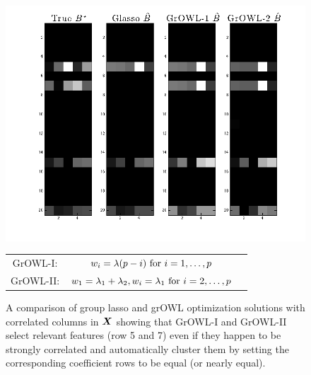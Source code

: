 \begin{figure}[!t]
    \centering
    \includegraphics[width=0.9\linewidth]{figures/sim3.png}
    \qquad
    \begin{tabular}[b]{ccc}
    \hline
    	GrOWL-I:	& $w_i = \lambda (p - i) \textnormal{ for } i = 1, \dots,  p $   &\\ 
	GrOWL-II:	& $w_1 = \lambda_1 +  \lambda_2, w_i = \lambda_1 \textnormal{ for } i = 2, \dots,  p$  &\\ \hline
    \end{tabular}
    \caption{A comparison of group lasso and grOWL optimization solutions with correlated columns in $\boldsymbol{X}$ showing that GrOWL-I and GrOWL-II select relevant features (row 5 and 7) even if they happen to be strongly correlated and automatically cluster them by setting the corresponding coefficient rows to be equal (or nearly equal).}
    \label{Fig:sim}
  \end{figure}

